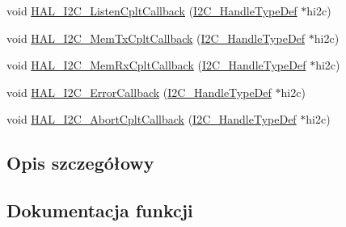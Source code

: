 \begin{DoxyCompactItemize}
\item 
void \hyperlink{group___i2_c___i_r_q___handler__and___callbacks_ga22544d1e6a14392cd5fe41e4e4f4cc96}{H\+A\+L\+\_\+\+I2\+C\+\_\+\+Listen\+Cplt\+Callback} (\hyperlink{group___i2_c__handle___structure__definition_ga68e9f45c2fd2161fb827ccdeabb55ea5}{I2\+C\+\_\+\+Handle\+Type\+Def} $\ast$hi2c)
\item 
void \hyperlink{group___i2_c___i_r_q___handler__and___callbacks_ga874f6104d2cdbced9f2ab6e941ec58f0}{H\+A\+L\+\_\+\+I2\+C\+\_\+\+Mem\+Tx\+Cplt\+Callback} (\hyperlink{group___i2_c__handle___structure__definition_ga68e9f45c2fd2161fb827ccdeabb55ea5}{I2\+C\+\_\+\+Handle\+Type\+Def} $\ast$hi2c)
\item 
void \hyperlink{group___i2_c___i_r_q___handler__and___callbacks_gac16a95413b35f05c5ce725fefd8531a5}{H\+A\+L\+\_\+\+I2\+C\+\_\+\+Mem\+Rx\+Cplt\+Callback} (\hyperlink{group___i2_c__handle___structure__definition_ga68e9f45c2fd2161fb827ccdeabb55ea5}{I2\+C\+\_\+\+Handle\+Type\+Def} $\ast$hi2c)
\item 
void \hyperlink{group___i2_c___i_r_q___handler__and___callbacks_ga4d5338cd64a656dfdc4154773bc4f05d}{H\+A\+L\+\_\+\+I2\+C\+\_\+\+Error\+Callback} (\hyperlink{group___i2_c__handle___structure__definition_ga68e9f45c2fd2161fb827ccdeabb55ea5}{I2\+C\+\_\+\+Handle\+Type\+Def} $\ast$hi2c)
\item 
void \hyperlink{group___i2_c___i_r_q___handler__and___callbacks_gaa4c2f59ea15698a1490401e5bbc3f296}{H\+A\+L\+\_\+\+I2\+C\+\_\+\+Abort\+Cplt\+Callback} (\hyperlink{group___i2_c__handle___structure__definition_ga68e9f45c2fd2161fb827ccdeabb55ea5}{I2\+C\+\_\+\+Handle\+Type\+Def} $\ast$hi2c)
\end{DoxyCompactItemize}


\subsection{Opis szczegółowy}


\subsection{Dokumentacja funkcji}
\mbox{\label{group___i2_c___i_r_q___handler__and___callbacks_gaa4c2f59ea15698a1490401e5bbc3f296}} 
